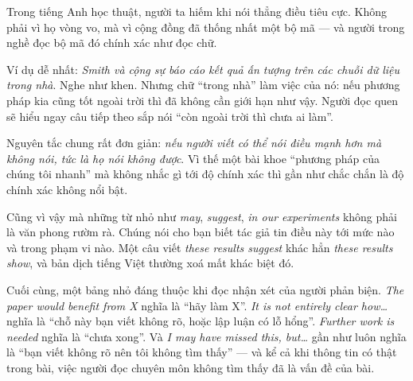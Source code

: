 \documentclass[../../english.tex]{subfiles}
\begin{document}
\begin{dongian}
Trong tiếng Anh học thuật, người ta hiếm khi nói thẳng điều tiêu cực. Không phải vì họ vòng vo, mà vì cộng đồng đã thống nhất một bộ mã --- và người trong nghề đọc bộ mã đó chính xác như đọc chữ.

Ví dụ dễ nhất: \emph{Smith và cộng sự báo cáo kết quả ấn tượng trên các chuỗi dữ liệu trong nhà}. Nghe như khen. Nhưng chữ ``trong nhà'' làm việc của nó: nếu phương pháp kia cũng tốt ngoài trời thì đã không cần giới hạn như vậy. Người đọc quen sẽ hiểu ngay câu tiếp theo sắp nói ``còn ngoài trời thì chưa ai làm''.

Nguyên tắc chung rất đơn giản: \emph{nếu người viết có thể nói điều mạnh hơn mà không nói, tức là họ nói không được}. Vì thế một bài khoe ``phương pháp của chúng tôi nhanh'' mà không nhắc gì tới độ chính xác thì gần như chắc chắn là độ chính xác không nổi bật.

Cũng vì vậy mà những từ nhỏ như \emph{may}, \emph{suggest}, \emph{in our experiments} không phải là văn phong rườm rà. Chúng nói cho bạn biết tác giả tin điều này tới mức nào và trong phạm vi nào. Một câu viết \emph{these results suggest} khác hẳn \emph{these results show}, và bản dịch tiếng Việt thường xoá mất khác biệt đó.

Cuối cùng, một bảng nhỏ đáng thuộc khi đọc nhận xét của người phản biện. \emph{The paper would benefit from X} nghĩa là ``hãy làm X''. \emph{It is not entirely clear how\ldots} nghĩa là ``chỗ này bạn viết không rõ, hoặc lập luận có lỗ hổng''. \emph{Further work is needed} nghĩa là ``chưa xong''. Và \emph{I may have missed this, but\ldots} gần như luôn nghĩa là ``bạn viết không rõ nên tôi không tìm thấy'' --- và kể cả khi thông tin có thật trong bài, việc người đọc chuyên môn không tìm thấy đã là vấn đề của bài.
\end{dongian}
\end{document}
